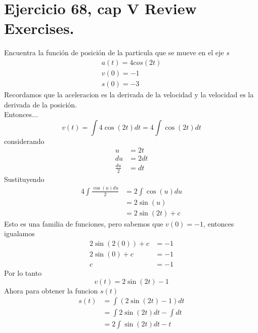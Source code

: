 \documentclass[11pt,letterpaper]{article}
\begin{document}
\section{Ejercicio 68, cap V Review Exercises.}
Encuentra la función de posición de la particula que se mueve en el eje \textit{s}
\begin{equation*}
  \begin{split}
    a(t)=4cos(2t)\\
    v(0)=-1\\
    s(0)=-3
  \end{split}
\end{equation*}
Recordamos que la aceleracion es la derivada de la velocidad y la velocidad es la derivada de la posición.\\
Entonces...
\begin{equation*}
  v(t)=\int 4\cos(2t)dt = 4 \int \cos(2t)dt
\end{equation*}
considerando
\begin{equation*}
  \begin{split}
    u &= 2t\\
    du &= 2dt\\
    \frac{du}{2} &= dt
  \end{split}
\end{equation*}
Sustituyendo
\begin{equation*}
  \begin{split}
    4 \int \frac{\cos(u)du}{2} &= 2\int\cos(u)du\\
    &= 2\sin(u)\\
    &= 2\sin(2t)+c
  \end{split}
\end{equation*}
Esto es una familia de funciones, pero sabemos que $v(0)=-1$, entonces igualamos
\begin{equation*}
  \begin{split}
    2\sin(2(0))+c &= -1\\
    2\sin(0)+c &= -1\\
    c &= -1
  \end{split}
\end{equation*}
Por lo tanto
\begin{equation*}
  v(t)=2\sin(2t)-1
\end{equation*}
Ahora para obtener la funcion $s(t)$
\begin{equation*}
  \begin{split}
    s(t)&=\int (2\sin(2t)-1) dt\\
    &= \int 2\sin(2t)dt - \int dt\\
    &= 2\int\sin(2t)dt - t
  \end{split}
\end{equation*}
\end{document}
